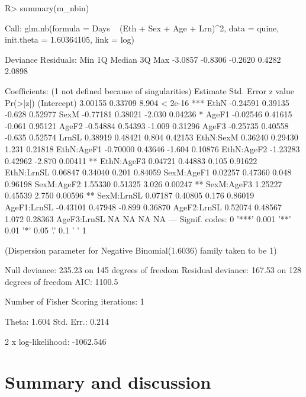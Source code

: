 \documentclass[article]{jss}
\begin{document}
\begin{CodeChunk}
\begin{CodeInput}
R> summary(m_nbin)
\end{CodeInput}
\begin{CodeOutput}
Call:
glm.nb(formula = Days ~ (Eth + Sex + Age + Lrn)^2, data = quine,
    init.theta = 1.60364105, link = log)

Deviance Residuals:
    Min       1Q   Median       3Q      Max
-3.0857  -0.8306  -0.2620   0.4282   2.0898

Coefficients: (1 not defined because of singularities)
            Estimate Std. Error z value Pr(>|z|)
(Intercept)  3.00155    0.33709   8.904  < 2e-16 ***
EthN        -0.24591    0.39135  -0.628  0.52977
SexM        -0.77181    0.38021  -2.030  0.04236 *
AgeF1       -0.02546    0.41615  -0.061  0.95121
AgeF2       -0.54884    0.54393  -1.009  0.31296
AgeF3       -0.25735    0.40558  -0.635  0.52574
LrnSL        0.38919    0.48421   0.804  0.42153
EthN:SexM    0.36240    0.29430   1.231  0.21818
EthN:AgeF1  -0.70000    0.43646  -1.604  0.10876
EthN:AgeF2  -1.23283    0.42962  -2.870  0.00411 **
EthN:AgeF3   0.04721    0.44883   0.105  0.91622
EthN:LrnSL   0.06847    0.34040   0.201  0.84059
SexM:AgeF1   0.02257    0.47360   0.048  0.96198
SexM:AgeF2   1.55330    0.51325   3.026  0.00247 **
SexM:AgeF3   1.25227    0.45539   2.750  0.00596 **
SexM:LrnSL   0.07187    0.40805   0.176  0.86019
AgeF1:LrnSL -0.43101    0.47948  -0.899  0.36870
AgeF2:LrnSL  0.52074    0.48567   1.072  0.28363
AgeF3:LrnSL       NA         NA      NA       NA
---
Signif. codes:  0 '***' 0.001 '**' 0.01 '*' 0.05 '.' 0.1 ' ' 1

(Dispersion parameter for Negative Binomial(1.6036) family taken to be 1)

    Null deviance: 235.23  on 145  degrees of freedom
Residual deviance: 167.53  on 128  degrees of freedom
AIC: 1100.5

Number of Fisher Scoring iterations: 1


              Theta:  1.604
          Std. Err.:  0.214

 2 x log-likelihood:  -1062.546
\end{CodeOutput}
\end{CodeChunk}




\section{Summary and discussion} \label{sec:summary}
\end{document}
